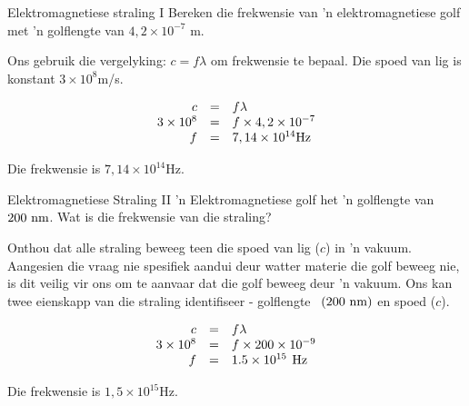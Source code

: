 \begin{wex}{E\-lek\-tro\-mag\-ne\-tie\-se straling I}{
Bereken die frekwensie van 'n elektromagnetiese golf met 'n golflengte van $4,2\ensuremath{\times}{10}^{-7}$ m.}
{ 
Ons gebruik die vergelyking: $c=f\lambda $ om frekwensie te bepaal. Die spoed van lig is konstant $3\ensuremath{\times}{10}^{8}$m/s.\par 

\begin{equation}
    \begin{array}{ccl}\hfill c& =& f\lambda \hfill \\ \hfill 3\ensuremath{\times}{10}^{8}& =& f\ensuremath{\times}4,2\ensuremath{\times}{10}^{-7}\hfill \\ \hfill f& =& 7,14\ensuremath{\times}{10}^{14}\text{Hz}\hfill \end{array}
\end{equation}



Die frekwensie is $7,14\times10^{14}$Hz.

}
\end{wex}
 
\begin{wex}{E\-lek\-tro\-mag\-ne\-tie\-se Straling II}{
'n Elektromagnetiese golf het 'n golflengte van $200\phantom{\rule{3.33333pt}{0ex}}\text{nm}$. Wat is die frekwensie van die straling?}{

Onthou dat alle straling beweeg teen die spoed van lig ($c$) in 'n vakuum.
Aangesien die vraag nie spesifiek aandui deur watter materie die golf beweeg nie, is dit veilig vir ons om te aanvaar dat die golf beweeg deur 'n vakuum. 
Ons kan twee eienskapp van die straling identifiseer - golflengte $\phantom{\rule{3.33333pt}{0ex}}\left(200\phantom{\rule{3.33333pt}{0ex}}\text{nm}\right)$ en spoed ($c$).\par 

\begin{equation}
    \begin{array}{ccc}\hfill c& =& f\lambda \hfill \\ \hfill 3\ensuremath{\times}{10}^{8}& =& f\ensuremath{\times}200\ensuremath{\times}{10}^{-9}\hfill \\ \hfill f& =& 1.5\ensuremath{\times}{10}^{15}\phantom{\rule{4pt}{0ex}}\text{Hz}\hfill \end{array}
\end{equation}


Die frekwensie is $1,5\times10^{15}$Hz.
}
\end{wex}


